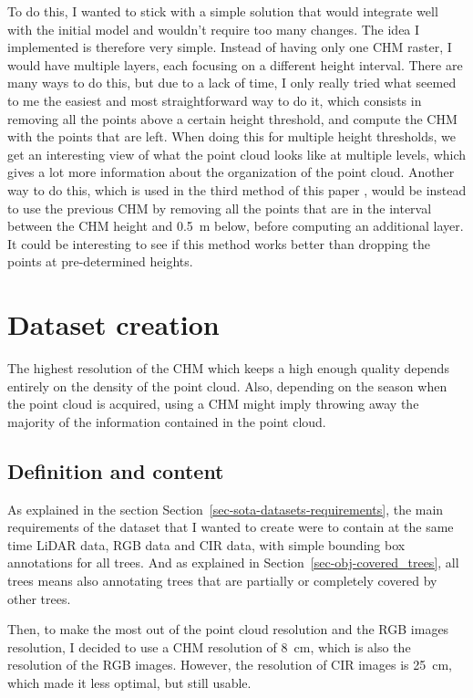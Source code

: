 \documentclass[
]{report}
\begin{document}
To do this, I wanted to stick with a simple solution that would
integrate well with the initial model and wouldn't require too many
changes. The idea I implemented is therefore very simple. Instead of
having only one CHM raster, I would have multiple layers, each focusing
on a different height interval. There are many ways to do this, but due
to a lack of time, I only really tried what seemed to me the easiest and
most straightforward way to do it, which consists in removing all the
points above a certain height threshold, and compute the CHM with the
points that are left. When doing this for multiple height thresholds, we
get an interesting view of what the point cloud looks like at multiple
levels, which gives a lot more information about the organization of the
point cloud. Another way to do this, which is used in the third method
of this paper \autocite{lidar_benchmark}, would be instead to use the
previous CHM by removing all the points that are in the interval between
the CHM height and 0.5~m below, before computing an additional layer. It
could be interesting to see if this method works better than dropping
the points at pre-determined heights.

\chapter{Dataset creation}\label{sec-dataset}

The highest resolution of the CHM which keeps a high enough quality
depends entirely on the density of the point cloud. Also, depending on
the season when the point cloud is acquired, using a CHM might imply
throwing away the majority of the information contained in the point
cloud.

\section{Definition and content}\label{definition-and-content}

As explained in the section
Section~\ref{sec-sota-datasets-requirements}, the main requirements of
the dataset that I wanted to create were to contain at the same time
LiDAR data, RGB data and CIR data, with simple bounding box annotations
for all trees. And as explained in Section~\ref{sec-obj-covered_trees},
all trees means also annotating trees that are partially or completely
covered by other trees.

Then, to make the most out of the point cloud resolution and the RGB
images resolution, I decided to use a CHM resolution of 8~cm, which is
also the resolution of the RGB images. However, the resolution of CIR
images is 25~cm, which made it less optimal, but still usable.
\end{document}
